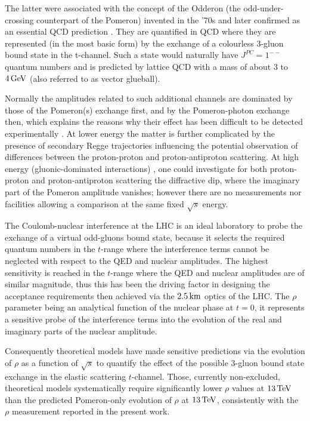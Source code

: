 The latter were associated with the concept of the Odderon (the odd-under-crossing counterpart of the Pomeron) invented in the '70s \cite{nicolescu-1973,nicolescu-1975} and later confirmed as an essential QCD prediction \cite{bartels-1980,kwiecinski-1980,jaroszewicz-1981,lipatov-1986,ioffe-2010}. They are quantified in QCD \cite{levin-1990,durham-2015-review} where they are represented (in the most basic form) by the exchange of a colourless 3-gluon bound state in the t-channel. Such a state would naturally have $J^{PC}=1^{--}$ quantum numbers and is predicted by lattice QCD with a mass of about $3$ to $4\,{\rm GeV}$ (also referred to as vector glueball).

Normally the amplitudes related to such additional channels are dominated by those of the Pomeron(s) exchange first, and by the Pomeron-photon exchange then, which explains the reasons why their effect has been difficult to be detected experimentally \cite{hera-odderon-2002}. At lower energy \cite{breakstone-85} the matter is further complicated by the presence of secondary Regge trajectories influencing the potential observation of differences between the proton-proton and proton-antiproton scattering. At high energy (gluonic-dominated interactions) \cite{yellow-report}, one could investigate for both proton-proton and proton-antiproton scattering the diffractive dip, where the imaginary part of the Pomeron amplitude vanishes; however there are no measurements nor facilities allowing a comparison at the same fixed $\sqrt s$ energy.

The Coulomb-nuclear interference at the LHC is an ideal laboratory to probe the exchange of a virtual odd-gluons bound state, because it selects the required quantum numbers in the $t$-range where the interference terms cannot be neglected with respect to the QED and nuclear amplitudes. The highest sensitivity is reached in the $t$-range where the QED and nuclear amplitudes are of similar magnitude, thus this has been the driving factor in designing the acceptance requirements then achieved via the $2.5\,{\rm km}$ optics of the LHC. The $\rho$ parameter being an analytical function of the nuclear phase at $t=0$, it represents a sensitive probe of the interference terms into the evolution of the real and imaginary parts of the nuclear amplitude.

Consequently theoretical models have made sensitive predictions via the evolution of $\rho$ as a function of $\sqrt s$ to quantify the effect of the possible 3-gluon bound state exchange in the elastic scattering $t$-channel. Those, currently non-excluded, theoretical models systematically require significantly lower $\rho$ values at $13\,{\rm TeV}$ than the predicted Pomeron-only evolution of $\rho$ at $13\,{\rm TeV}$, consistently with the $\rho$ measurement reported in the present work.

